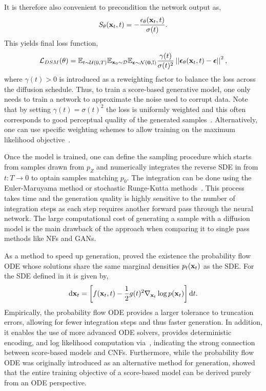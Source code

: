 It is therefore also convenient to precondition the network output as,
\begin{equation}
    \label{eq:precondition}
    S_\theta(\mathbf{x}_t, t) = - \frac{\epsilon_\theta(\mathbf{x}_t, t)}{\sigma(t)}.
\end{equation}
This yields final loss function,
\begin{equation}
    \label{eq:noise_loss}
    \mathcal{L}_{DSM}(\theta) =
    \mathbb{E}_{t \sim \mathcal{U}(0, T)}
    \mathbb{E}_{\mathbf{x}_0 \sim \mathcal{D}}
    \mathbb{E}_{\boldsymbol{\epsilon} \sim \mathcal{N}(\mathbf{0}, \mathbb{I})}
    \frac{\gamma(t)}{\sigma(t)^2}
    \left|\left|\boldsymbol{\epsilon}_\theta(\mathbf{x}_t, t) - \boldsymbol{\epsilon}\right|\right|^2,
\end{equation}
where $\gamma(t) > 0$ is introduced as a reweighting factor to balance the loss across the diffusion schedule.
Thus, to train a score-based generative model, one only needs to train a network to approximate the noise used to corrupt data.
Note that by setting $\gamma(t) = \sigma(t)^2$ the loss is uniformly weighted and this often corresponds to good perceptual quality of the generated samples~\cite{VariationalPerspectiveDiffusionBased, VariationalDiffusionModels, ImprovedDenoisingDiffusion}.
Alternatively, one can use specific weighting schemes to allow training on the maximum likelihood objective~\cite{UnderstandingDiffusionModels}.

Once the model is trained, one can define the sampling procedure which starts from samples drawn from $p_Z$ and numerically integrates the reverse SDE in  from $t: T \rightarrow 0$ to optain samples matching $p_0$.
The integration can be done using the Euler-Maruyama method or stochastic Runge-Kutta methods~\cite{NumericalSolutionStochastic}.
This process takes time and the generation quality is highly sensitive to the number of integration steps as each step requires another forward pass through the neural network.
The large computational cost of generating a sample with a diffusion model is the main drawback of the approach when comparing it to single pass methods like NFs and GANs.

As a method to speed up generation, \textcite{ScoreBasedGenerativeModeling} proved the existence the probability flow ODE whose solutions share the same marginal densities $p_t(\mathbf{x}_t)$ as the SDE.
For the SDE defined in  it is given by,
\begin{equation}
    \label{eq:probability_flow}
    \mathrm{d} \mathbf{x}_t = \left[f(\mathbf{x}_t, t) - \frac{1}{2} g(t)^2 \nabla_{\mathbf{x}_t} \log p(\mathbf{x}_t)\right] \mathrm{d} t.
\end{equation}
Empirically, the probability flow ODE provides a larger tolerance to truncation errors, allowing for fewer integration steps and thus faster generation.
In addition, it enables the use of more advanced ODE solvers, provides deterministic encoding, and log likelihood computation via~, indicating the strong connection between score-based models and CNFs.
Furthermore, while the probability flow ODE was originally introduced as an alternative method for generation, \textcite{ElucidatingDesignSpace} showed that the entire training objective of a score-based model can be derived purely from an ODE perspective.

